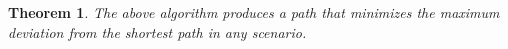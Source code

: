 \documentclass{article}
\newtheorem{thm}{Theorem}
\begin{document}
\begin{comment}
\begin{description}
	\item[Step 0:] For each scenario we construct a singe-source shortest path tree on the graph. This has a complexity of $\mathcal{O}(s m)$. At the end of this step we have an $(s+3)-$tuple as a label at each vertex consisting of its distances from the origin (vertex $1$) in each scenario, with two further labels, say, $-1$ and $+\infty$ added on to indicate the predecessor in the robust shortest path, and distance from the origin along the robust shortest path. At a vertex $i$ we denote its label as $(d_i^1,\dots,d_i^s,P_i,d_i^{\textrm{robust}},s^{*})$, where $s_i^{*}$ is the scenario for which the deviation is the greatest.
	\item[Step 1:] We next go through the vertices in a topological order and, for each vertex $j$, we look at all its incoming edges $(i,j)$\footnote{It isn't necessary for the correctness of our algorithm but we go through the list of predecessors in the topological order as well.} and we update the last two entries of $j$'s label as follows:
		\begin{description}
			\item[Update $j$:] Let $d_{ij}^s$ be the weight on the edge $(i,j)$ in scenario $s$. We compute the biggest of the following quantities: $\{d_{ij}^s + d_i^s - d_j^s, d_{ij^{s_i^{*}}} + d_i^{\textrm{robust}} - d_j^{s_i^{*}}\}$, denoted $D_j^{\textrm{max}}$ which corresponds to scenario $s'$, and compare it to the current value of $d_j^{\textrm{robust}} - d_j^{s_j^{*}}$. If $D_j^{\textrm{max}}$ is smaller, the value $d_j^{\textrm{robust}}$ is replaced by $d_j^{s'} + D_j^{\textrm{max}}$ and the $P$ and $s$ values are updated correspondingly.
		\end{description}
		The complexity of this step is also $\mathcal{O}(s m)$.
	\item[Step 2:] Finally the path that minimizes the maximum deviation is produced by starting at vertex $n$ and looking at predecessors $P$ until we reach vertex $1$. The cost of this path in any scenario (and indeed the deviation from the minimum cost to reach vertex $n$ in any scenario) is trivial to calculate. The complexity of this step is no more than $\mathcal{O}(s m)$.
\end{description}
\end{comment}

\begin{thm}
The above algorithm produces a path that minimizes the maximum deviation from the shortest path in any scenario.
\end{thm}
\end{document}
